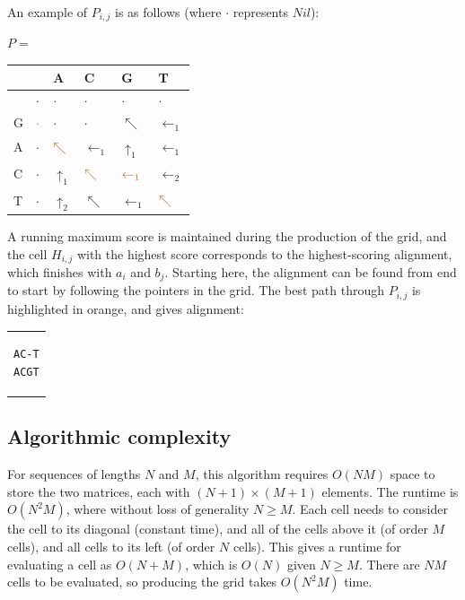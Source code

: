 An example of $P_{i,j}$ is as follows (where $\cdot$ represents $Nil$):
\begin{center}
$P = $     \begin{tabular}{|p{}|p{}p{}p{}p{}p{}|} \hline
& & \hfil {\ttfamily A} & \hfil {\ttfamily C} & \hfil {\ttfamily G} & \hfil {\ttfamily T} \\ \hline
& \hfil $\cdot$ & \hfil $\cdot$ & \hfil $\cdot$ & \hfil $\cdot$ & \hfil $\cdot$ \\
\hfil {\ttfamily G} & \hfil ${\color{darkorange} \cdot}$ & \hfil $\cdot$ & \hfil $\cdot$ & \hfil $\nwarrow$ & \hfil $\leftarrow_1$ \\
\hfil {\ttfamily A} & \hfil $\cdot$ & \hfil ${\color{darkorange} \nwarrow}$ & \hfil $\leftarrow_1$ & \hfil $\uparrow_1$ & $\leftarrow_1$ \\
\hfil {\ttfamily C} & \hfil $\cdot$ & \hfil $\uparrow_1$ & \hfil ${\color{darkorange} \nwarrow}$ & \hfil ${\color{darkorange} \leftarrow_1}$ & $\leftarrow_2$ \\
\hfil {\ttfamily T} & \hfil $\cdot$ & \hfil $\uparrow_2$ & \hfil $\nwarrow$ & \hfil $\leftarrow_1$ & \hfil ${\color{darkorange} \nwarrow}$ \\ \hline
\end{tabular}
\end{center}

A running maximum score is maintained during the production of the grid, and the cell $H_{i,j}$ with the highest score corresponds to the highest-scoring alignment, which finishes with $a_i$ and $b_j$.
Starting here, the alignment can be found from end to start by following the pointers in the grid. The best path through $P_{i,j}$ is highlighted in {\color{darkorange}orange}, and gives alignment:
\begin{center}
\begin{tabular}{c}
\begin{lstlisting}[basicstyle=\ttfamily\linespread{0.8}]
AC-T
ACGT
\end{lstlisting}
\end{tabular}
\end{center}

\subsection{Algorithmic complexity}
\label{sec:SW_Complexity}
For sequences of lengths $N$ and $M$, this algorithm requires $O(NM)$ space to store the two matrices, each with $(N+1)\times(M+1)$ elements.
The runtime is $O(N^2 M)$, where without loss of generality $N\geq M$.
Each cell needs to consider the cell to its diagonal (constant time), and all of the cells above it (of order $M$ cells), and all cells to its left (of order $N$ cells).
This gives a runtime for evaluating a cell as $O(N+M)$, which is $O(N)$ given $N\geq M$.
There are $NM$ cells to be evaluated, so producing the grid takes $O(N^2 M)$ time.


